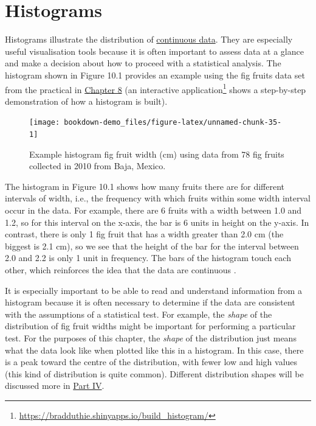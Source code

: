 \documentclass[
]{scrbook}
\begin{document}
\hypertarget{histograms}{%
\section{Histograms}\label{histograms}}

Histograms illustrate the distribution of \protect\hyperlink{Chapter_5}{continuous data}.
They are especially useful visualisation tools because it is often important to assess data at a glance and make a decision about how to proceed with a statistical analysis.
The histogram shown in Figure 10.1 provides an example using the fig fruits data set from the practical in \protect\hyperlink{Chapter_8}{Chapter 8} (an interactive application\footnote{\url{https://bradduthie.shinyapps.io/build_histogram/}} shows a step-by-step demonstration of how a histogram is built).

\begin{figure}
\texttt{[image: bookdown-demo\_files/figure-latex/unnamed-chunk-35-1]} \caption{Example histogram fig fruit width (cm) using data from 78 fig fruits collected in 2010 from Baja, Mexico.}\label{fig:unnamed-chunk-35}
\end{figure}

The histogram in Figure 10.1 shows how many fruits there are for different intervals of width, i.e., the frequency with which fruits within some width interval occur in the data.
For example, there are 6 fruits with a width between 1.0 and 1.2, so for this interval on the x-axis, the bar is 6 units in height on the y-axis.
In contrast, there is only 1 fig fruit that has a width greater than 2.0 cm (the biggest is 2.1 cm), so we see that the height of the bar for the interval between 2.0 and 2.2 is only 1 unit in frequency.
The bars of the histogram touch each other, which reinforces the idea that the data are continuous \citep{Dytham2011, Sokal1995}.

It is especially important to be able to read and understand information from a histogram because it is often necessary to determine if the data are consistent with the assumptions of a statistical test.
For example, the \emph{shape} of the distribution of fig fruit widths might be important for performing a particular test.
For the purposes of this chapter, the \emph{shape} of the distribution just means what the data look like when plotted like this in a histogram.
In this case, there is a peak toward the centre of the distribution, with fewer low and high values (this kind of distribution is quite common).
Different distribution shapes will be discussed more in \protect\hyperlink{Week4}{Part IV}.
\end{document}

